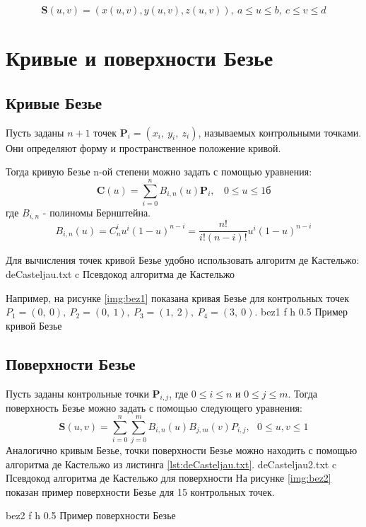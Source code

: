 \documentclass{bmstu}
\begin{document}
\begin{equation}
    \mathbf{S}(u, v) = (x(u, v), y(u, v), z(u, v)),~        a \le u \le b,~c \le v \le d
\end{equation}

\section{Кривые и поверхности Безье}

\subsection{Кривые Безье}

Пусть заданы $n+1$ точек $\mathbf{P}_i = (x_i,~y_i,~z_i)$, называемых контрольными точками. Они определяют форму и пространственное положение кривой.

Тогда кривую Безье n-ой степени можно задать с помощью уравнения:
\begin{equation}
    \mathbf{C}(u) = \sum\limits_{i=0}^n B_{i, n}(u)\mathbf{P}_i,~~~~ 0\le u\le 1б
\end{equation}
где $B_{i, n}$ - полиномы Бернштейна.
\begin{equation}
    B_{i, n}(u) = C^i_nu^i(1-u)^{n-i} = \frac{n!}{i!(n-i)!}u^i(1-u)^{n-i}
\end{equation}

Для вычисления точек кривой Безье удобно использовать алгоритм де Кастельжо:
{deCasteljau.txt} %
{c} %
{Псевдокод алгоритма де Кастельжо} %

Например, на рисунке \ref{img:bez1} показана кривая Безье для контрольных точек $P_1 = (0,~0),~P_2=(0,~1),~P_3=(1,~2),~P_4=(3,~0)$.
{bez1} %
{f} %
{h} %
{0.5\textwidth} %
{Пример кривой Безье} %

\subsection{Поверхности Безье}

Пусть заданы контрольные точки $\mathbf{P}_{i,j}$, где $0 \le i \le n$ и $0 \le j \le m$.
Тогда поверхность Безье можно задать с помощью следующего уравнения:
\begin{equation}
    \mathbf{S}(u,v)=\sum\limits_{i=0}^n\sum\limits_{j=0}^m B_{i,n}(u)B_{j,m}(v)P_{i,j},~~~ 0\le u,v\le 1
\end{equation}
Аналогично кривым Безье, точки поверхности Безье можно находить с помощью алгоритма де Кастельжо из листинга \ref{lst:deCasteljau.txt}.
{deCasteljau2.txt} %
{c} %
{Псевдокод алгоритма де Кастельжо для поверхности} %
На рисунке \ref{img:bez2} показан пример поверхности Безье для 15 контрольных точек.

{bez2} %
{f} %
{h} %
{0.5\textwidth} %
{Пример поверхности Безье} %
\end{document}
